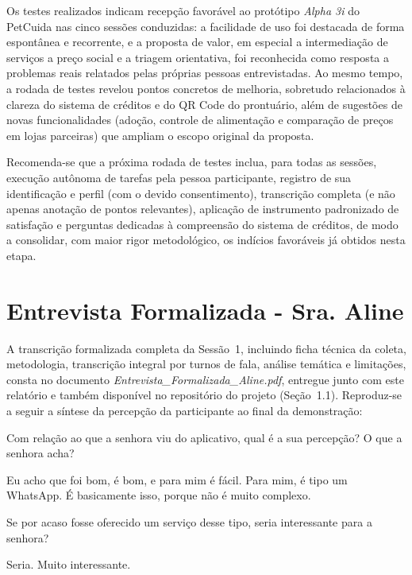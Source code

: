 \documentclass[
    12pt,
    openright,
    oneside,
    a4paper
]{abntex2}
\newenvironment{turnos}
  {\begin{list}{}{%
     \setlength{\leftmargin}{2.2cm}%
     \setlength{\labelwidth}{2.0cm}%
     \setlength{\labelsep}{0.2cm}%
     \setlength{\itemsep}{0.45em}%
     \setlength{\parsep}{0pt}}}
  {\end{list}}
\newcommand{\fala}[1]{\item[\textbf{#1}\hfill]}
\begin{document}
Os testes realizados indicam recepção favorável ao protótipo \textit{Alpha 3i} do PetCuida
nas cinco sessões conduzidas: a facilidade de uso foi destacada de forma espontânea e
recorrente, e a proposta de valor, em especial a intermediação de serviços a preço social e
a triagem orientativa, foi reconhecida como resposta a problemas reais relatados pelas
próprias pessoas entrevistadas. Ao mesmo tempo, a rodada de testes revelou pontos
concretos de melhoria, sobretudo relacionados à clareza do sistema de créditos e do QR Code
do prontuário, além de sugestões de novas funcionalidades (adoção, controle de alimentação e
comparação de preços em lojas parceiras) que ampliam o escopo original da proposta.


Recomenda-se que a próxima rodada de testes inclua, para todas as sessões, execução autônoma
de tarefas pela pessoa participante, registro de sua identificação e perfil (com o devido
consentimento), transcrição completa (e não apenas anotação de pontos relevantes), aplicação
de instrumento padronizado de satisfação e perguntas dedicadas à compreensão do sistema de
créditos, de modo a consolidar, com maior rigor metodológico, os indícios favoráveis já
obtidos nesta etapa.

\appendix

\chapter{Entrevista Formalizada - Sra. Aline}
\label{apx:aline}

A transcrição formalizada completa da Sessão~1, incluindo ficha técnica da coleta,
metodologia, transcrição integral por turnos de fala, análise temática e limitações, consta
no documento \textit{Entrevista\_Formalizada\_Aline.pdf}, entregue junto com este relatório e
também disponível no repositório do projeto (Seção~1.1). Reproduz-se a seguir a síntese da
percepção da participante ao final da demonstração:

\begin{turnos}
\fala{E:} Com relação ao que a senhora viu do aplicativo, qual é a sua percepção? O que a
senhora acha?
\fala{P:} Eu acho que foi bom, é bom, e para mim é fácil. Para mim, é tipo um WhatsApp. É
basicamente isso, porque não é muito complexo.
\fala{E:} Se por acaso fosse oferecido um serviço desse tipo, seria interessante para a
senhora?
\fala{P:} Seria. Muito interessante.
\end{turnos}
\end{document}
